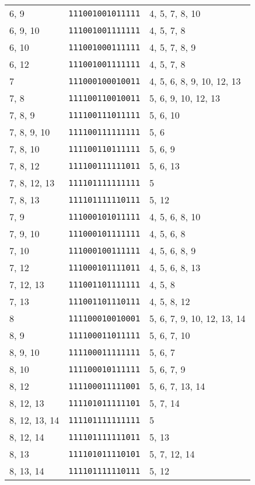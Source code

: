 \documentclass[a4paper,12pt]{article}
\begin{document}
\begin{longtable}{l|l|l}
        6, 9&\texttt{111001001011111}&4, 5, 7, 8, 10\\
        6, 9, 10&\texttt{111001001111111}&4, 5, 7, 8\\
        6, 10&\texttt{111001000111111}&4, 5, 7, 8, 9\\
        6, 12&\texttt{111001001111111}&4, 5, 7, 8\\
        7&\texttt{111000100010011}&4, 5, 6, 8, 9, 10, 12, 13\\
        7, 8&\texttt{111100110010011}&5, 6, 9, 10, 12, 13\\
        7, 8, 9&\texttt{111100111011111}&5, 6, 10\\
        7, 8, 9, 10&\texttt{111100111111111}&5, 6\\
        7, 8, 10&\texttt{111100110111111}&5, 6, 9\\
        7, 8, 12&\texttt{111100111111011}&5, 6, 13\\
        7, 8, 12, 13&\texttt{111101111111111}&5\\
        7, 8, 13&\texttt{111101111110111}&5, 12\\
        7, 9&\texttt{111000101011111}&4, 5, 6, 8, 10\\
        7, 9, 10&\texttt{111000101111111}&4, 5, 6, 8\\
        7, 10&\texttt{111000100111111}&4, 5, 6, 8, 9\\
        7, 12&\texttt{111000101111011}&4, 5, 6, 8, 13\\
        7, 12, 13&\texttt{111001101111111}&4, 5, 8\\
        7, 13&\texttt{111001101110111}&4, 5, 8, 12\\
        8&\texttt{111100010010001}&5, 6, 7, 9, 10, 12, 13, 14\\
        8, 9&\texttt{111100011011111}&5, 6, 7, 10\\
        8, 9, 10&\texttt{111100011111111}&5, 6, 7\\
        8, 10&\texttt{111100010111111}&5, 6, 7, 9\\
        8, 12&\texttt{111100011111001}&5, 6, 7, 13, 14\\
        8, 12, 13&\texttt{111101011111101}&5, 7, 14\\
        8, 12, 13, 14&\texttt{111101111111111}&5\\
        8, 12, 14&\texttt{111101111111011}&5, 13\\
        8, 13&\texttt{111101011110101}&5, 7, 12, 14\\
        8, 13, 14&\texttt{111101111110111}&5, 12\\

\end{longtable}
\end{document}
